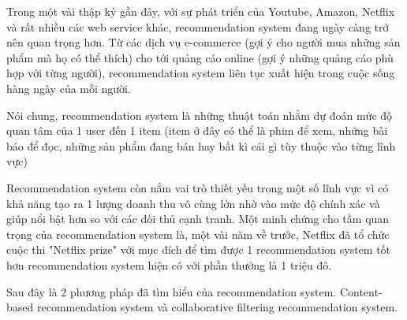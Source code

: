 Trong một vài thập kỷ gần đây, với sự phát triển của Youtube, Amazon, Netflix và rất nhiều các web service khác, recommendation system đang ngày càng trở nên quan trọng hơn. Từ các dịch vụ e-commerce (gợi ý cho người mua những sản phẩm mà họ có thể thích) cho tới quảng cáo online (gợi ý những quảng cáo phù hợp với từng người), recommendation system liên tục xuất hiện trong cuộc sống hàng ngày của mỗi người.

Nói chung, recommendation system là những thuật toán nhằm dự đoán mức độ quan tâm của 1 user đến 1 item (item ở đây có thể là phim để xem, những bài báo để đọc, những sản phẩm đang bán hay bất kì cái gì tùy thuộc vào từng lĩnh vực)

Recommendation system còn nắm vai trò thiết yếu trong một số lĩnh vực vì có khả năng tạo ra 1 lượng doanh thu vô cùng lớn nhờ vào mức độ chính xác và giúp nổi bật hơn so với các đối thủ cạnh tranh. Một minh chứng cho tầm quan trọng của recommendation system là, một vài năm về trước, Netflix đã tổ chức cuộc thi "Netflix prize" với mục đích để tìm được 1 recommendation system tốt hơn recommendation system hiện có với phần thưởng là 1 triệu đô.

Sau đây là 2 phương pháp đã tìm hiểu của recommendation system. Content-based recommendation system và collaborative filtering recommendation system.
